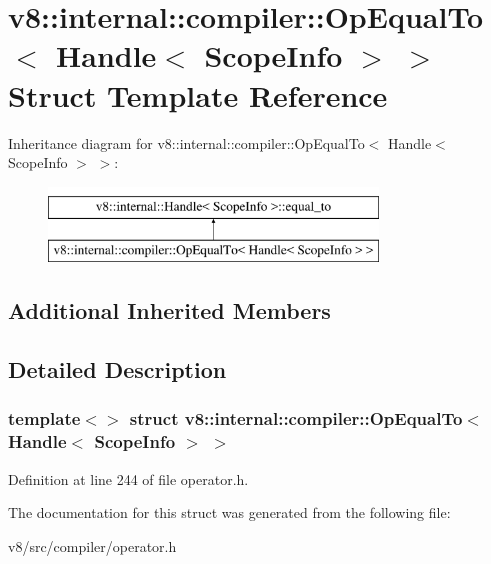 \hypertarget{structv8_1_1internal_1_1compiler_1_1OpEqualTo_3_01Handle_3_01ScopeInfo_01_4_01_4}{}\section{v8\+:\+:internal\+:\+:compiler\+:\+:Op\+Equal\+To$<$ Handle$<$ Scope\+Info $>$ $>$ Struct Template Reference}
\label{structv8_1_1internal_1_1compiler_1_1OpEqualTo_3_01Handle_3_01ScopeInfo_01_4_01_4}
Inheritance diagram for v8\+:\+:internal\+:\+:compiler\+:\+:Op\+Equal\+To$<$ Handle$<$ Scope\+Info $>$ $>$\+:\begin{figure}[H]
\begin{center}
\leavevmode
\includegraphics[height=2.000000cm]{structv8_1_1internal_1_1compiler_1_1OpEqualTo_3_01Handle_3_01ScopeInfo_01_4_01_4}
\end{center}
\end{figure}
\subsection*{Additional Inherited Members}


\subsection{Detailed Description}
\subsubsection*{template$<$$>$\newline
struct v8\+::internal\+::compiler\+::\+Op\+Equal\+To$<$ Handle$<$ Scope\+Info $>$ $>$}



Definition at line 244 of file operator.\+h.



The documentation for this struct was generated from the following file\+:\begin{DoxyCompactItemize}
\item 
v8/src/compiler/operator.\+h\end{DoxyCompactItemize}
